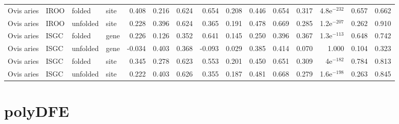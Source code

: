 \begin{longtable}{llllrrrrrrrrrrr}
          Ovis aries &                      IROO &    folded &  site &                              0.408 &                               0.216 &                 0.624 &                 0.654 &                              0.208 &                               0.446 &                 0.654 &                 0.317 & 4.8e$^{-232}$ &  0.657 &  0.662 \\
          Ovis aries &                      IROO &  unfolded &  site &                              0.228 &                               0.396 &                 0.624 &                 0.365 &                              0.191 &                               0.478 &                 0.669 &                 0.285 & 1.2e$^{-207}$ &  0.262 &  0.910 \\
          Ovis aries &                      ISGC &    folded &  gene &                              0.226 &                               0.126 &                 0.352 &                 0.641 &                              0.145 &                               0.250 &                 0.396 &                 0.367 & 1.3e$^{-113}$ &  0.648 &  0.742 \\
          Ovis aries &                      ISGC &  unfolded &  gene &                             -0.034 &                               0.403 &                 0.368 &                -0.093 &                              0.029 &                               0.385 &                 0.414 &                 0.070 &         1.000 &  0.104 &  0.323 \\
          Ovis aries &                      ISGC &    folded &  site &                              0.345 &                               0.278 &                 0.623 &                 0.553 &                              0.201 &                               0.450 &                 0.651 &                 0.309 &   4e$^{-182}$ &  0.784 &  0.813 \\
          Ovis aries &                      ISGC &  unfolded &  site &                              0.222 &                               0.403 &                 0.626 &                 0.355 &                              0.187 &                               0.481 &                 0.668 &                 0.279 & 1.6e$^{-198}$ &  0.263 &  0.845 \\
\end{longtable}
\newpage\section*{polyDFE} 
